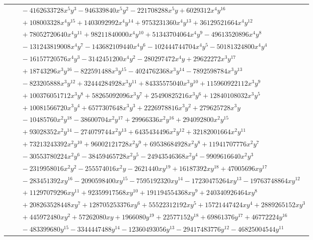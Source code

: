 \documentclass[11pt]{article}
\begin{document}
\begin{longtable}{@{}ll@{}}
 & $\quad -4162633728x^{5}y^{3}-946339840x^{5}y^{2}-221708288x^{5}y+6029312x^{4}y^{16}$\\
 & $\quad +108003328x^{4}y^{15}+1403092992x^{4}y^{14}+9753231360x^{4}y^{13}+36129521664x^{4}y^{12}$\\
 & $\quad +78052720640x^{4}y^{11}+98211840000x^{4}y^{10}+51343704064x^{4}y^{9}-49613520896x^{4}y^{8}$\\
 & $\quad -131243819008x^{4}y^{7}-143682109440x^{4}y^{6}-102444744704x^{4}y^{5}-50181324800x^{4}y^{4}$\\
 & $\quad -16157720576x^{4}y^{3}-3142451200x^{4}y^{2}-280297472x^{4}y+29622272x^{3}y^{17}$\\
 & $\quad +18743296x^{3}y^{16}-822591488x^{3}y^{15}-4024762368x^{3}y^{14}-7892598784x^{3}y^{13}$\\
 & $\quad -823205888x^{3}y^{12}+32444284928x^{3}y^{11}+84335575040x^{3}y^{10}+115960922112x^{3}y^{9}$\\
 & $\quad +100376051712x^{3}y^{8}+58265092096x^{3}y^{7}+25490825216x^{3}y^{6}+12840108032x^{3}y^{5}$\\
 & $\quad +10081566720x^{3}y^{4}+6577307648x^{3}y^{3}+2226978816x^{3}y^{2}+279625728x^{3}y$\\
 & $\quad -10485760x^{2}y^{18}-38600704x^{2}y^{17}+29966336x^{2}y^{16}+294092800x^{2}y^{15}$\\
 & $\quad +93028352x^{2}y^{14}-274079744x^{2}y^{13}+6435434496x^{2}y^{12}+32182001664x^{2}y^{11}$\\
 & $\quad +73213243392x^{2}y^{10}+96002121728x^{2}y^{9}+69538684928x^{2}y^{8}+11941707776x^{2}y^{7}$\\
 & $\quad -30553780224x^{2}y^{6}-38459465728x^{2}y^{5}-24943546368x^{2}y^{4}-9909616640x^{2}y^{3}$\\
 & $\quad -2319958016x^{2}y^{2}-255574016x^{2}y-2621440xy^{19}+16187392xy^{18}+47005696xy^{17}$\\
 & $\quad -283451392xy^{16}-2090598400xy^{15}-7595192320xy^{14}-17230475264xy^{13}-19763748864xy^{12}$\\
 & $\quad +11297079296xy^{11}+92359917568xy^{10}+191194554368xy^{9}+240340926464xy^{8}$\\
 & $\quad +208263528448xy^{7}+128705253376xy^{6}+55522312192xy^{5}+15721447424xy^{4}+2889265152xy^{3}$\\
 & $\quad +445972480xy^{2}+57262080xy+1966080y^{19}+22577152y^{18}+69861376y^{17}+46772224y^{16}$\\
 & $\quad -483399680y^{15}-3344447488y^{14}-12360493056y^{13}-29417483776y^{12}-46825004544y^{11}$\\

\end{longtable}
\end{document}
